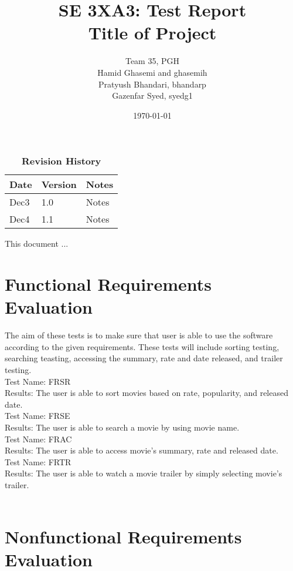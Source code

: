 \documentclass[12pt, titlepage]{article}
\title{SE 3XA3: Test Report\\Title of Project}
\author{Team 35, PGH
		\\ Hamid Ghasemi and ghasemih
		\\ Pratyush Bhandari, bhandarp
		\\ Gazenfar Syed, syedg1
}
\date{\today}
\begin{document}
\maketitle

\tableofcontents
\listoftables
\listoffigures

\begin{table}[bp]
\caption{\bf Revision History}
\begin{tabularx}{\textwidth}{p{3cm}p{2cm}X}
\toprule {\bf Date} & {\bf Version} & {\bf Notes}\\
\midrule
Dec3 & 1.0 & Notes\\
Dec4 & 1.1 & Notes\\
\bottomrule
\end{tabularx}
\end{table}

\newpage


This document ...

\section{Functional Requirements Evaluation}
The aim of these tests is to make sure that user is able to use the software according to the given requirements. These tests will include sorting testing, searching teasting, accessing the summary, rate and date released, and trailer testing.\\

Test Name: FRSR \\
Results: The user is able to sort movies based on rate, popularity, and released date. \\ 

Test Name: FRSE \\
Results: The user is able to search a movie by using movie name. \\ 

Test Name: FRAC \\
Results: The user is able to access movie's summary, rate and released date.\\ 

Test Name: FRTR\\
Results: The user is able to watch a movie trailer by simply selecting movie's trailer. \\ \\

\section{Nonfunctional Requirements Evaluation}
\end{document}
